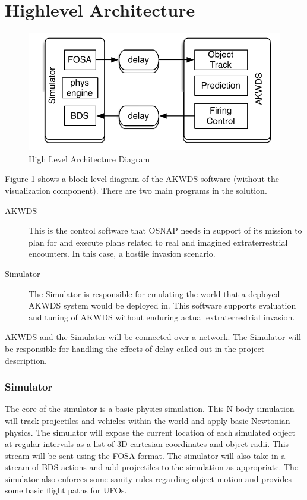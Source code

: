 \chapter*{Highlevel Architecture}

\begin{figure}[h]
\includegraphics{./akwds_arch.pdf}
\caption{High Level Architecture Diagram}
\label{fig:arch}
\end{figure}

Figure 1 shows a block level diagram of the AKWDS software (without the visualization component). There are two main programs in the solution.
\begin{description}
\item[AKWDS] This is the control software that OSNAP needs in support of its mission to plan for and execute plans related to real and imagined extraterrestrial encounters. In this case, a hostile invasion scenario.
\item[Simulator] The Simulator is responsible for emulating the world that a deployed AKWDS system would be deployed in. This software supports evaluation and tuning of AKWDS without enduring actual extraterrestrial invasion.
\end{description}
AKWDS and the Simulator will be connected over a network. The Simulator will be responsible for handling the effects of delay called out in the project description.

\subsection*{Simulator}
The core of the simulator is a basic physics simulation. This N-body simulation will track projectiles and vehicles within the world and apply basic Newtonian physics. The simulator will expose the current location of each simulated object at regular intervals as a list of 3D cartesian coordinates and object radii. This stream will be sent using the FOSA format. The simulator will also take in a stream of BDS actions and add projectiles to the simulation as appropriate. The simulator also enforces some sanity rules regarding object motion and provides some basic flight paths for UFOs.

